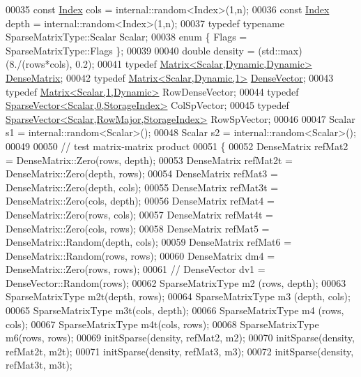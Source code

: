 \begin{DoxyCode}
00035   \textcolor{keyword}{const} \hyperlink{namespace_eigen_a62e77e0933482dafde8fe197d9a2cfde}{Index} cols  = internal::random<Index>(1,n);
00036   \textcolor{keyword}{const} \hyperlink{namespace_eigen_a62e77e0933482dafde8fe197d9a2cfde}{Index} depth = internal::random<Index>(1,n);
00037   \textcolor{keyword}{typedef} \textcolor{keyword}{typename} SparseMatrixType::Scalar Scalar;
00038   \textcolor{keyword}{enum} \{ Flags = SparseMatrixType::Flags \};
00039 
00040   \textcolor{keywordtype}{double} density = (std::max)(8./(rows*cols), 0.2);
00041   \textcolor{keyword}{typedef} \hyperlink{group___core___module}{Matrix<Scalar,Dynamic,Dynamic>} 
      \hyperlink{group___core___module}{DenseMatrix};
00042   \textcolor{keyword}{typedef} \hyperlink{group___core___module}{Matrix<Scalar,Dynamic,1>} \hyperlink{group___core___module}{DenseVector};
00043   \textcolor{keyword}{typedef} \hyperlink{group___core___module_class_eigen_1_1_matrix}{Matrix<Scalar,1,Dynamic>} RowDenseVector;
00044   \textcolor{keyword}{typedef} \hyperlink{group___sparse_core___module_class_eigen_1_1_sparse_vector}{SparseVector<Scalar,0,StorageIndex>} ColSpVector;
00045   \textcolor{keyword}{typedef} \hyperlink{group___sparse_core___module_class_eigen_1_1_sparse_vector}{SparseVector<Scalar,RowMajor,StorageIndex>} RowSpVector;
00046 
00047   Scalar s1 = internal::random<Scalar>();
00048   Scalar s2 = internal::random<Scalar>();
00049 
00050   \textcolor{comment}{// test matrix-matrix product}
00051   \{
00052     DenseMatrix refMat2  = DenseMatrix::Zero(rows, depth);
00053     DenseMatrix refMat2t = DenseMatrix::Zero(depth, rows);
00054     DenseMatrix refMat3  = DenseMatrix::Zero(depth, cols);
00055     DenseMatrix refMat3t = DenseMatrix::Zero(cols, depth);
00056     DenseMatrix refMat4  = DenseMatrix::Zero(rows, cols);
00057     DenseMatrix refMat4t = DenseMatrix::Zero(cols, rows);
00058     DenseMatrix refMat5  = DenseMatrix::Random(depth, cols);
00059     DenseMatrix refMat6  = DenseMatrix::Random(rows, rows);
00060     DenseMatrix dm4 = DenseMatrix::Zero(rows, rows);
00061 \textcolor{comment}{//     DenseVector dv1 = DenseVector::Random(rows);}
00062     SparseMatrixType m2 (rows, depth);
00063     SparseMatrixType m2t(depth, rows);
00064     SparseMatrixType m3 (depth, cols);
00065     SparseMatrixType m3t(cols, depth);
00066     SparseMatrixType m4 (rows, cols);
00067     SparseMatrixType m4t(cols, rows);
00068     SparseMatrixType m6(rows, rows);
00069     initSparse(density, refMat2,  m2);
00070     initSparse(density, refMat2t, m2t);
00071     initSparse(density, refMat3,  m3);
00072     initSparse(density, refMat3t, m3t);

\end{DoxyCode}
